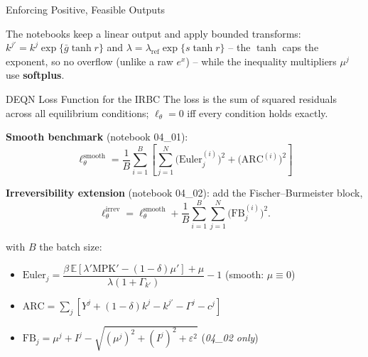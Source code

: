 \documentclass[aspectratio=169,11pt]{beamer}
\newcommand{\emphc}[1]{\textcolor{harvardcrimson}{#1}}
\newcommand{\E}[1]{\mathbb{E}\!\left[#1\right]}
\begin{document}
\begin{frame}{Enforcing Positive, Feasible Outputs}
\begin{center}
\end{center}

\vspace{0.2em}
{\small
The notebooks keep a \emphc{linear} output and apply bounded transforms: $k^{j\prime}=k^j\exp\{\bar g\tanh r\}$ and $\lambda=\lambda_{\text{ref}}\exp\{s\tanh r\}$ -- the $\tanh$ caps the exponent, so no overflow (unlike a raw $e^x$) -- while the inequality multipliers $\mu^j$ use \textbf{softplus}.
}
\end{frame}

\begin{frame}{DEQN Loss Function for the IRBC}
\footnotesize
The loss is the \emphc{sum of squared residuals} across all equilibrium conditions; $\ell_\theta = 0$ iff every condition holds exactly.

\vspace{0.15em}
\textbf{Smooth benchmark} (notebook 04\_01):
\[
\boxed{
\ell^{\mathrm{smooth}}_\theta = \frac{1}{B}\sum_{i=1}^{B} \left[\sum_{j=1}^{N} \bigl(\text{Euler}_j^{(i)}\bigr)^2 + \bigl(\text{ARC}^{(i)}\bigr)^2\right]
}
\]

\vspace{0.1em}
\textbf{Irreversibility extension} (notebook 04\_02): add the Fischer--Burmeister block,
\[
\ell^{\mathrm{irrev}}_\theta = \ell^{\mathrm{smooth}}_\theta + \frac{1}{B}\sum_{i=1}^{B}\sum_{j=1}^{N}\bigl(\text{FB}_j^{(i)}\bigr)^2.
\]

\vspace{0.1em}
with $B$ the batch size:
\begin{itemize}\itemsep0pt
    \item $\text{Euler}_j = \dfrac{\beta\,\E{\lambda' \text{MPK}' - (1-\delta)\mu'} + \mu}{\lambda(1+\Gamma_{k'})} - 1$ \quad (smooth: $\mu \equiv 0$)
    \item $\text{ARC} = \sum_j [Y^j + (1-\delta)k^j - k^{j\prime} - \Gamma^j - c^j]$
    \item $\text{FB}_j = \mu^j + I^j - \sqrt{(\mu^j)^2 + (I^j)^2 + \varepsilon^2}$ \quad (\emph{04\_02 only})
\end{itemize}
\end{frame}
\end{document}

